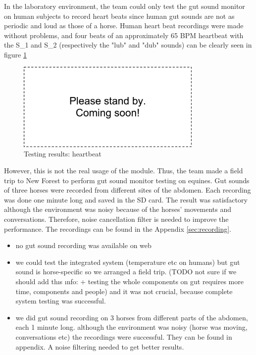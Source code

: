 In the laboratory environment, the team could only test the gut sound monitor on human subjects to record heart beats since human gut sounds are not as periodic and loud as those of a horse. Human heart beat recordings were made without problems, and four beats of an approximately 65 BPM heartbeat with the S\_1 and S\_2 (respectively the "lub" and "dub" sounds) can be clearly seen in figure \ref{fig:heartbeat}

\begin{figure}
\centering
\includegraphics[width=0.8\textwidth]{Images/dummy}
\caption{Testing results: heartbeat}
\label{fig:heartbeat}
\end{figure}

However, this is not the real usage of the module. Thus, the team made a field trip to New Forest to perform gut sound monitor testing on equines. Gut sounds of three horses were recorded from different sites of the abdomen. Each recording was done one minute long and saved in the SD card. The result was satisfactory although the environment was noisy because of the horses' movements and conversations. Therefore, noise cancellation filter is needed to improve the performance. The recordings can be found in the Appendix \ref{sec:recording}.

\begin{itemize}
\item no gut sound recording was available on web
\item we could test the integrated system (temperature etc on humans) but gut sound is horse-specific so we arranged a field trip. (TODO{} not sure if we should add thıs ınfo: + testing the whole components on gut requires more time, components and people) and it was not crucial, because complete system testing was successful.
\item we did gut sound recording on 3 horses from different parts of the abdomen, each 1 minute long. although the environment was noisy (horse was moving, conversations etc) the recordings were successful. They can be found in appendix. A noise filtering needed to get better results.
\end{itemize}


